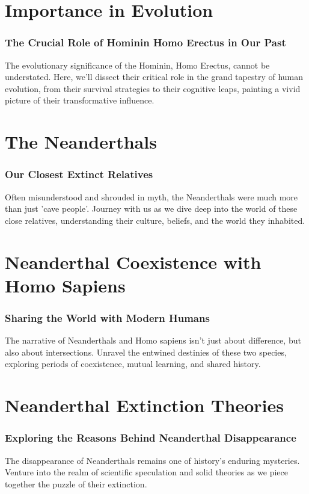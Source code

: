 \documentclass[a4paper,12pt]{book}
\begin{document}
\chapter{Importance in Evolution}
\subsection*{The Crucial Role of Hominin Homo Erectus in Our Past}
The evolutionary significance of the Hominin, Homo Erectus, cannot be understated. Here, we'll dissect their critical role in the grand tapestry of human evolution, from their survival strategies to their cognitive leaps, painting a vivid picture of their transformative influence.

\chapter{The Neanderthals}
\subsection*{Our Closest Extinct Relatives}
Often misunderstood and shrouded in myth, the Neanderthals were much more than just 'cave people'. Journey with us as we dive deep into the world of these close relatives, understanding their culture, beliefs, and the world they inhabited.

\chapter{Neanderthal Coexistence with Homo Sapiens}
\subsection*{Sharing the World with Modern Humans}
The narrative of Neanderthals and Homo sapiens isn't just about difference, but also about intersections. Unravel the entwined destinies of these two species, exploring periods of coexistence, mutual learning, and shared history.

\chapter{Neanderthal Extinction Theories}
\subsection*{Exploring the Reasons Behind Neanderthal Disappearance}
The disappearance of Neanderthals remains one of history's enduring mysteries. Venture into the realm of scientific speculation and solid theories as we piece together the puzzle of their extinction.
\end{document}
